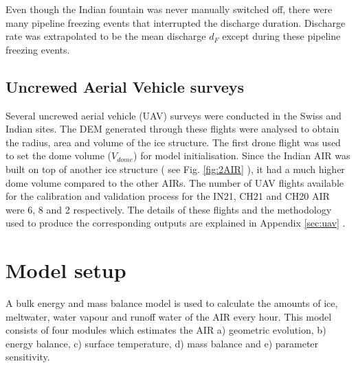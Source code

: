 \documentclass[utf8]{frontiersSCNS} %
\begin{document}
Even though the Indian fountain was never manually switched off, there were many pipeline freezing events that
interrupted the discharge duration. Discharge rate was extrapolated to be the mean discharge $d_F$ except during
these pipeline freezing events.

\subsection{Uncrewed Aerial Vehicle surveys}

Several uncrewed aerial vehicle (UAV) surveys were conducted in the Swiss and Indian sites. The DEM generated
through these flights were analysed to obtain the radius, area and volume of the ice structure.  The first drone
flight was used to set the dome volume ($V_{dome}$) for model initialisation. Since the Indian AIR was built on top
of another ice structure ( see Fig. \ref{fig:2AIR} ), it had a much higher dome volume compared to the other AIRs.
The number of UAV flights available for the calibration and validation process for the IN21, CH21 and CH20 AIR were
6, 8 and 2 respectively.  The details of these flights and the methodology used to produce the corresponding
outputs are explained in Appendix \ref{sec:uav} .

\section{Model setup}

A bulk energy and mass balance model is used to calculate the amounts of ice, meltwater, water vapour and runoff water
of the AIR every hour. This model consists of four modules which estimates the AIR a) geometric evolution, b) energy
balance, c) surface temperature, d) mass balance and e) parameter sensitivity.
\end{document}
